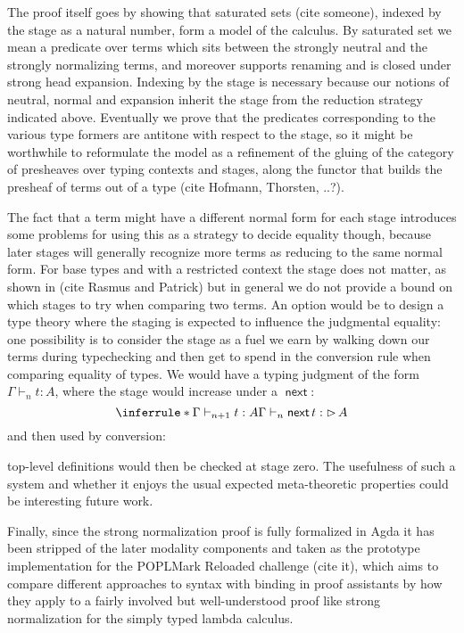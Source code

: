 \documentclass{book}
\DeclareMathOperator{\Later}{\vartriangleright}
\DeclareMathOperator{\next}{\ensuremath{\mathsf{next}}}
\begin{document}
  The proof itself goes by showing that saturated sets (cite someone),
  indexed by the stage as a natural number, form a model of the
  calculus. By saturated set we mean a predicate over terms which sits
  between the strongly neutral and the strongly normalizing terms, and
  moreover supports renaming and is closed under strong head
  expansion. Indexing by the stage is necessary because our notions
  of neutral, normal and expansion inherit the stage from the
  reduction strategy indicated above.
  Eventually we prove that the predicates corresponding to the various
  type formers are antitone with respect to the stage, so it might be
  worthwhile to reformulate the model as a refinement of the gluing of
  the category of presheaves over typing contexts and stages, along the functor that
  builds the presheaf of terms out of a type (cite Hofmann, Thorsten, ..?).

  The fact that a term might have a different normal form for each
  stage introduces some problems for using this as a strategy to
  decide equality though, because later stages will generally
  recognize more terms as reducing to the same normal form.
  For base types and with a restricted context the stage does not
  matter, as shown in (cite Rasmus and Patrick) but in general we do
  not provide a bound on which stages to try when comparing two terms.
  An option would be to design a type theory where the staging is expected
  to influence the judgmental equality: one possibility is to consider
  the stage as a fuel we earn by walking down our terms during
  typechecking and then get to spend in the conversion rule when
  comparing equality of types.
  We would have a typing judgment of the form $\Gamma \vdash_n t : A$, where the stage would increase under a $\next$:
  \[
  \inferrule*{\Gamma \vdash_{n+1} t : A}
             {\Gamma \vdash_n \next t : \Later A}
  \]
  and then used by conversion:
  top-level definitions would then be checked at stage zero. The
  usefulness of such a system and whether it enjoys the usual expected
  meta-theoretic properties could be interesting future work.

  Finally, since the strong normalization proof is fully formalized in
  Agda it has been stripped of the later modality components and taken
  as the prototype implementation for the POPLMark Reloaded challenge (cite it),
  which aims to compare different approaches to syntax with binding in
  proof assistants by how they apply to a fairly involved but
  well-understood proof like strong normalization for the simply typed
  lambda calculus.
\end{document}
